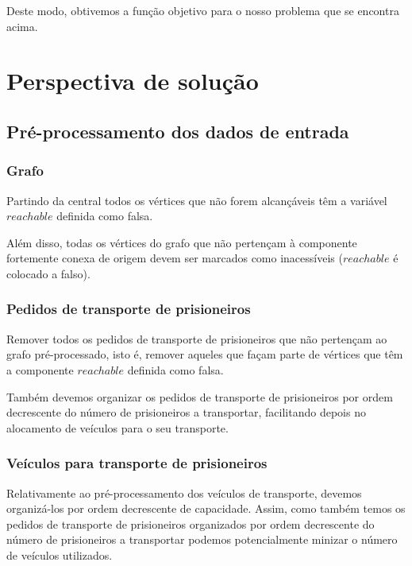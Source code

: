 \documentclass[article, a4paper, 12pt, oneside]{memoir}
\begin{document}
Deste modo, obtivemos a função objetivo para o nosso problema que se encontra acima.

\newpage
\chapter[Perspectiva de solução][Perspectiva de solução]{Perspectiva de solução} \label{\thechapter}

\section{Pré-processamento dos dados de entrada}

\subsection{Grafo}
Partindo da central todos os vértices que não forem alcançáveis têm a variável $reachable$ definida como falsa.

Além disso, todas os vértices do grafo que não pertençam à componente fortemente conexa de origem devem ser marcados como inacessíveis ($reachable$ é colocado a falso).

\subsection{Pedidos de transporte de prisioneiros}
Remover todos os pedidos de transporte de prisioneiros que não pertençam ao grafo pré-processado, isto é, remover aqueles que façam parte de vértices que têm a componente $reachable$ definida como falsa.

Também devemos organizar os pedidos de transporte de prisioneiros por ordem decrescente do número de prisioneiros a transportar, facilitando depois no alocamento de veículos para o seu transporte.

\subsection{Veículos para transporte de prisioneiros}
Relativamente ao pré-processamento dos veículos de transporte, devemos organizá-los por ordem decrescente de capacidade. Assim, como também temos os pedidos de transporte de prisioneiros organizados por ordem decrescente do número de prisioneiros a transportar podemos potencialmente minizar o número de veículos utilizados.
\end{document}
